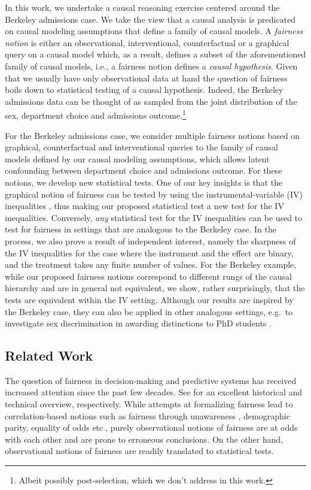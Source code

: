In this work, we undertake a causal reasoning exercise centered around the Berkeley admissions case. We take the view that a causal analysis is predicated on causal modeling assumptions that define a family of causal models. A \textit{fairness notion} is either an observational, interventional, counterfactual or a graphical query on a causal model which, as a result, defines a subset of the aforementioned family of causal models, i.e., a fairness notion defines a \textit{causal hypothesis}. Given that we usually have only observational data at hand the question of fairness boils down to statistical testing of a causal hypothesis. Indeed, the Berkeley admissions data can be thought of as sampled from the joint distribution of the sex, department choice and admissions outcome.\footnote{Albeit possibly post-selection, which we don't address in this work.}

For the Berkeley admissions case, we consider multiple fairness notions based on graphical, counterfactual and interventional queries to the family of causal models defined by our causal modeling assumptions, which allows latent confounding between department choice and admissions outcome. For these notions, we develop new statistical tests. One of our key insights is that the graphical notion of fairness can be tested by using the instrumental-variable (IV) inequalities \citep{Pearl95}, thus making our proposed statistical test a new test for the IV inequalities. Conversely, \emph{any} statistical test for the IV inequalities can be used to test for fairness in settings that are analogous to the Berkeley case. In the process, we also prove a result of independent interest, namely the sharpness of the IV inequalities for the case where the instrument and the effect are binary, and the treatment takes any finite number of values. For the Berkeley example, while our proposed fairness notions correspond to different rungs of the causal hierarchy and are in general not equivalent, we show, rather surprisingly, that the tests are equivalent within the IV setting. Although our results are inspired by the Berkeley case, they can also be applied in other analogous settings, e.g.\ to investigate sex discrimination in awarding distinctions to PhD students \citep{Bol23}.

\subsection{Related Work}
The question of fairness in decision-making and predictive systems has received increased attention since the past few decades. See \citet{HutchinsonMitchell19,BarocasHN23} for an excellent historical  and technical overview, respectively. While attempts at formalizing fairness lead to correlation-based notions such as fairness through unawareness \citep{DworkHPRZ12}, demographic parity, equality of odds \citep{HardtPS16} etc., purely observational notions of fairness are at odds with each other \cite{Chouldechova17, KleinbergMR17} and are prone to erroneous conclusions. On the other hand, observational notions of fairness are readily translated to statistical tests.

